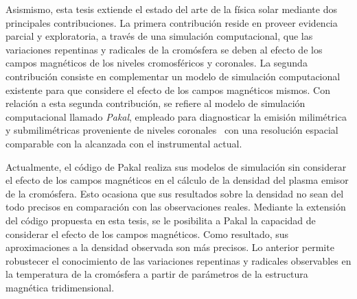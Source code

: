 Asismismo, esta tesis extiende el estado del arte de la f\'isica solar mediante dos principales contribuciones. La primera contribuci\'on reside en proveer evidencia parcial y exploratoria, a trav\'es de una simulaci\'on computacional,  que las variaciones repentinas y radicales de la crom\'osfera se deben al efecto de los campos magn\'eticos de los niveles cromosf\'ericos y coronales. La segunda contribuci\'on consiste en complementar un modelo de simulaci\'on computacional existente para que considere el efecto de los campos magn\'eticos mismos. Con relaci\'on a esta segunda contribuci\'on, se refiere al modelo de simulaci\'on computacional llamado \emph{Pakal}, empleado para diagnosticar la emisi\'on milim\'etrica y submilim\'etricas proveniente de niveles coronales~\citep{2010ApJS..188..437D} con una resoluci\'on espacial comparable con la alcanzada con el instrumental actual.

Actualmente, el c\'odigo de Pakal realiza sus modelos de simulaci\'on sin considerar el efecto de los campos magn\'eticos en el c\'alculo de la densidad del plasma emisor de la crom\'osfera. Esto ocasiona que sus resultados sobre la densidad no sean del todo precisos en comparaci\'on con las observaciones reales. Mediante la extensi\'on del c\'odigo propuesta en esta tesis, se le posibilita a Pakal la capacidad de considerar el efecto de los campos magn\'eticos. Como resultado, sus aproximaciones a la densidad observada son m\'as precisos. Lo anterior permite robustecer el conocimiento de las variaciones repentinas y radicales observables en la temperatura de la crom\'osfera a partir de par\'ametros de la estructura magn\'etica tridimensional.

